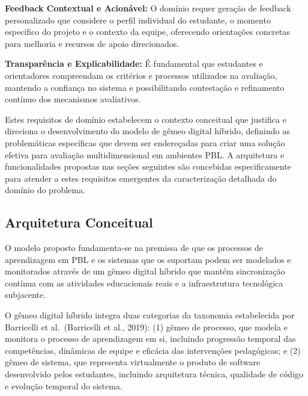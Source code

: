 \documentclass[english, spanish, brazilian]{modelo_dt}
\begin{document}
\textbf{Feedback Contextual e Acionável:} O domínio requer geração de feedback personalizado que considere o perfil individual do estudante, o momento específico do projeto e o contexto da equipe, oferecendo orientações concretas para melhoria e recursos de apoio direcionados.

\textbf{Transparência e Explicabilidade:} É fundamental que estudantes e orientadores compreendam os critérios e processos utilizados na avaliação, mantendo a confiança no sistema e possibilitando contestação e refinamento contínuo dos mecanismos avaliativos.

Estes requisitos de domínio estabelecem o contexto conceitual que justifica e direciona o desenvolvimento do modelo de gêmeo digital híbrido, definindo as problemáticas específicas que devem ser endereçadas para criar uma solução efetiva para avaliação multidimensional em ambientes PBL. A arquitetura e funcionalidades propostas nas seções seguintes são concebidas especificamente para atender a estes requisitos emergentes da caracterização detalhada do domínio do problema.

\subsection{Arquitetura Conceitual}

O modelo proposto fundamenta-se na premissa de que os processos de aprendizagem em PBL e os sistemas que os suportam podem ser modelados e monitorados através de um gêmeo digital híbrido que mantém sincronização contínua com as atividades educacionais reais e a infraestrutura tecnológica subjacente\@.

O gêmeo digital híbrido integra duas categorias da taxonomia estabelecida por Barricelli et al.\@~(Barricelli et al., 2019): (1) gêmeo de processo, que modela e monitora o processo de aprendizagem em si, incluindo progressão temporal das competências, dinâmicas de equipe e eficácia das intervenções pedagógicas; e (2) gêmeo de sistema, que representa virtualmente o produto de software desenvolvido pelos estudantes, incluindo arquitetura técnica, qualidade de código e evolução temporal do sistema\@.
\end{document}
